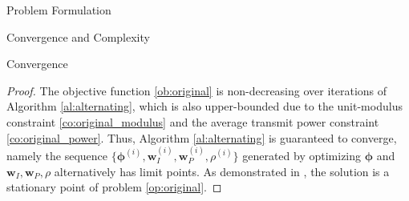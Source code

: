 \documentclass{IEEEtran}
\begin{document}
\begin{section}{Problem Formulation}
\begin{subsection}{Convergence and Complexity}
\begin{subsubsection}{Convergence}
			\begin{proof}\label{pf:ao}
				The objective function \ref{ob:original} is non-decreasing over iterations of Algorithm \ref{al:alternating}, which is also upper-bounded due to the unit-modulus constraint \ref{co:original_modulus} and the average transmit power constraint \ref{co:original_power}. Thus, Algorithm \ref{al:alternating} is guaranteed to converge, namely the sequence $\{\boldsymbol{\phi}^{(i)},\boldsymbol{w}_I^{(i)},\boldsymbol{w}_P^{(i)},\rho^{(i)}\}$ generated by optimizing $\boldsymbol{\phi}$ and $\boldsymbol{w}_I,\boldsymbol{w}_P,\rho$ alternatively has limit points. As demonstrated in \cite{Grippo2000,Hong2016,Li2013a}, the solution is a stationary point of problem \ref{op:original}.
			\end{proof}
		\end{subsubsection}
	\end{subsection}
\end{section}
\end{document}
